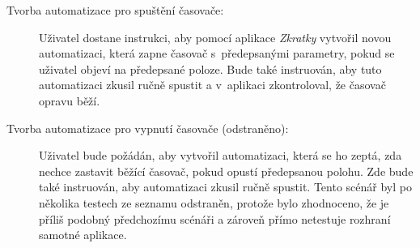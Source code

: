 \begin{description}
\item[Tvorba automatizace pro spuštění časovače:] Uživatel dostane instrukci, aby pomocí aplikace \emph{Zkratky} vytvořil novou automatizaci, která zapne časovač s~předepsanými parametry, pokud se uživatel objeví na předepsané poloze. Bude také instruován, aby tuto automatizaci zkusil ručně spustit a v~aplikaci zkontroloval, že časovač opravu běží.
\item[Tvorba automatizace pro vypnutí časovače (odstraněno):] Uživatel bude požádán, aby vytvořil automatizaci, která se ho zeptá, zda nechce zastavit běžící časovač, pokud opustí předepsanou polohu. Zde bude také instruován, aby automatizaci zkusil ručně spustit. Tento scénář byl po několika testech ze seznamu odstraněn, protože bylo zhodnoceno, že je příliš podobný předchozímu scénáři a zároveň přímo netestuje rozhraní samotné aplikace.
\end{description}
